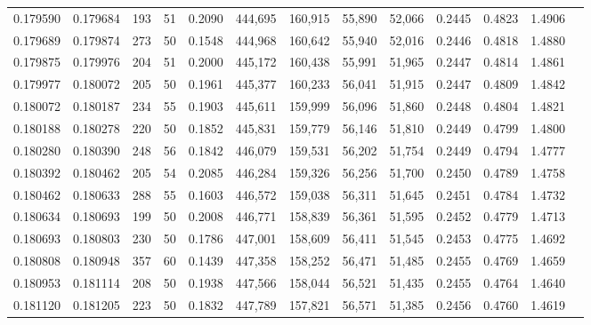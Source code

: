\begin{tabular}{rrrrrrrrrrrrr}
0.179590 & 0.179684 &   193 &  51 &                                     0.2090 & 444,695 & 160,915 &  55,890 &  52,066 & 0.2445 & 0.4823 & 1.4906 \\
0.179689 & 0.179874 &   273 &  50 &                                     0.1548 & 444,968 & 160,642 &  55,940 &  52,016 & 0.2446 & 0.4818 & 1.4880 \\
0.179875 & 0.179976 &   204 &  51 &                                     0.2000 & 445,172 & 160,438 &  55,991 &  51,965 & 0.2447 & 0.4814 & 1.4861 \\
0.179977 & 0.180072 &   205 &  50 &                                     0.1961 & 445,377 & 160,233 &  56,041 &  51,915 & 0.2447 & 0.4809 & 1.4842 \\
0.180072 & 0.180187 &   234 &  55 &                                     0.1903 & 445,611 & 159,999 &  56,096 &  51,860 & 0.2448 & 0.4804 & 1.4821 \\
0.180188 & 0.180278 &   220 &  50 &                                     0.1852 & 445,831 & 159,779 &  56,146 &  51,810 & 0.2449 & 0.4799 & 1.4800 \\
0.180280 & 0.180390 &   248 &  56 &                                     0.1842 & 446,079 & 159,531 &  56,202 &  51,754 & 0.2449 & 0.4794 & 1.4777 \\
0.180392 & 0.180462 &   205 &  54 &                                     0.2085 & 446,284 & 159,326 &  56,256 &  51,700 & 0.2450 & 0.4789 & 1.4758 \\
0.180462 & 0.180633 &   288 &  55 &                                     0.1603 & 446,572 & 159,038 &  56,311 &  51,645 & 0.2451 & 0.4784 & 1.4732 \\
0.180634 & 0.180693 &   199 &  50 &                                     0.2008 & 446,771 & 158,839 &  56,361 &  51,595 & 0.2452 & 0.4779 & 1.4713 \\
0.180693 & 0.180803 &   230 &  50 &                                     0.1786 & 447,001 & 158,609 &  56,411 &  51,545 & 0.2453 & 0.4775 & 1.4692 \\
0.180808 & 0.180948 &   357 &  60 &                                     0.1439 & 447,358 & 158,252 &  56,471 &  51,485 & 0.2455 & 0.4769 & 1.4659 \\
0.180953 & 0.181114 &   208 &  50 &                                     0.1938 & 447,566 & 158,044 &  56,521 &  51,435 & 0.2455 & 0.4764 & 1.4640 \\
0.181120 & 0.181205 &   223 &  50 &                                     0.1832 & 447,789 & 157,821 &  56,571 &  51,385 & 0.2456 & 0.4760 & 1.4619 \\

\end{tabular}
